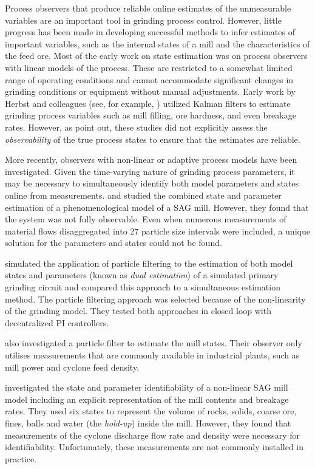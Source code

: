 Process observers that produce reliable online estimates of the unmeasurable variables are an important tool in grinding process control. However, little progress has been made in developing successful methods to infer estimates of important variables, such as the internal states of a mill and the characteristics of the feed ore. Most of the early work on state estimation was on process observers with linear models of the process. These are restricted to a somewhat limited range of operating conditions and cannot accommodate significant changes in grinding conditions or equipment without manual adjustments. Early work by Herbst and colleagues (see, for example, \cite{herbst_model-based_1992}) utilized Kalman filters to estimate grinding process variables such as mill filling, ore hardness, and even breakage rates. However, as \cite{le_roux_ekf_2017} point out, these studies did not explicitly assess the \textit{observability} of the true process states to ensure that the estimates are reliable.

More recently, observers with non-linear or adaptive process models have been investigated. Given the time-varying nature of grinding process parameters, it may be necessary to simultaneously identify both model parameters and states online from measurements. \cite{apelt_inferential_2002} and \cite{apelt_inferential_2002-1} studied the combined state and parameter estimation of a phenomenological model of a \gls{SAG} mill. However, they found that the system was not fully observable. Even when numerous measurements of material flows disaggregated into 27 particle size intervals were included, a unique solution for the parameters and states could not be found.

\cite{olivier_dual_2012} simulated the application of particle filtering to the estimation of both model states and parameters (known as \textit{dual estimation}) of a simulated primary grinding circuit and compared this approach to a simultaneous estimation method. The particle filtering approach was selected because of the non-linearity of the grinding model. They tested both approaches in closed loop with decentralized \gls{PI} controllers.

\cite{le_roux_throughput_2016} also investigated a particle filter to estimate the mill states. Their observer only utilises measurements that are commonly available in industrial plants, such as mill power and cyclone feed density.

\cite{le_roux_state_2016} investigated the state and parameter identifiability of a non-linear \gls{SAG} mill model including an explicit representation of the mill contents and breakage rates. They used six states to represent the volume of rocks, solids, coarse ore, fines, balls and water (the \textit{hold-up}) inside the mill. However, they found that measurements of the cyclone discharge flow rate and density were necessary for identifiability. Unfortunately, these measurements are not commonly installed in practice.

